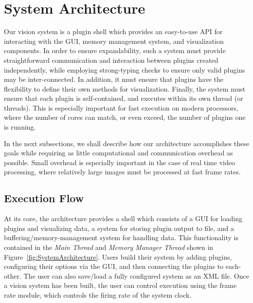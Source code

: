 \section{System Architecture}

Our vision system is a plugin shell which provides an easy-to-use API for interacting with the GUI, memory management system, and visualization components. In order to ensure expandability, such a system must provide straightforward communication and interaction between plugins created independently, while employing strong-typing checks to ensure only valid plugins may be inter-connected. In addition, it must ensure that plugins have the flexibility to define their own methods for visualization. Finally, the system must ensure that each plugin is self-contained, and executes within its own thread (or threads). This is especially important for fast execution on modern processors, where the number of cores can match, or even exceed, the number of plugins one is running. 

In the next subsections, we shall describe how our architecture accomplishes these goals while requiring as little computational and communication overhead as possible. Small overhead is especially important in the case of real time video processing, where relatively large images must be processed at fast frame rates. 

\subsection{Execution Flow}
At its core, the architecture provides a shell which consists of a GUI for loading plugins and visualizing data, a system for storing plugin output to file, and a buffering/memory-management system for handling data. This functionality is contained in the \emph{Main Thread} and \emph{Memory Manager Thread} shown in Figure~\ref{fig:SystemArchitecture}. Users build their system by adding plugins, configuring their options via the GUI, and then connecting the plugins to each-other. The user can also save/load a fully configured system as an XML file. Once a vision system has been built, the user can control execution using the frame rate module, which controls the firing rate of the system clock. 

